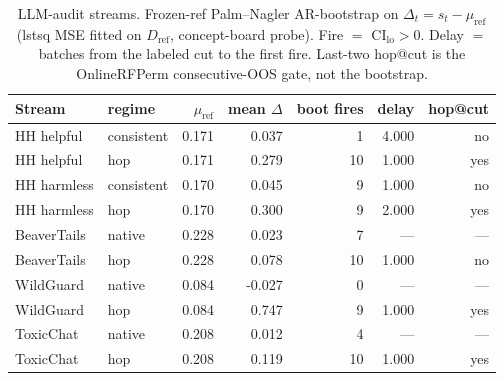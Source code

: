 \begin{table}[ht]
\centering
\caption{LLM-audit streams. Frozen-ref Palm--Nagler AR-bootstrap on $\Delta_t=s_t-\mu_{\mathrm{ref}}$ (lstsq MSE fitted on $D_{\mathrm{ref}}$, concept-board probe). Fire $=$ $\mathrm{CI}_{\mathrm{lo}}>0$. Delay $=$ batches from the labeled cut to the first fire. Last-two hop@cut is the OnlineRFPerm consecutive-OOS gate, not the bootstrap.}
\label{tab:llm-audit-online-bootstrap}
\small
\begin{tabular}{@{}l l r r r r r@{}}
\toprule
Stream & regime & $\mu_{\mathrm{ref}}$ & mean $\Delta$ & boot fires & delay & hop@cut \\
\midrule
HH helpful & consistent & 0.171 & 0.037 & 1 & 4.000 & no \\
HH helpful & hop & 0.171 & 0.279 & 10 & 1.000 & yes \\
HH harmless & consistent & 0.170 & 0.045 & 9 & 1.000 & no \\
HH harmless & hop & 0.170 & 0.300 & 9 & 2.000 & yes \\
BeaverTails & native & 0.228 & 0.023 & 7 & — & --- \\
BeaverTails & hop & 0.228 & 0.078 & 10 & 1.000 & no \\
WildGuard & native & 0.084 & -0.027 & 0 & — & --- \\
WildGuard & hop & 0.084 & 0.747 & 9 & 1.000 & yes \\
ToxicChat & native & 0.208 & 0.012 & 4 & — & --- \\
ToxicChat & hop & 0.208 & 0.119 & 10 & 1.000 & yes \\
\bottomrule
\end{tabular}
\end{table}
